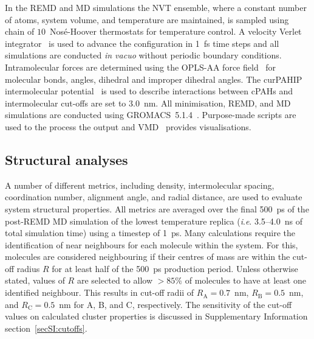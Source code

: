 In the REMD and MD simulations the NVT ensemble, where a constant number of atoms, system volume, and temperature are maintained, is sampled using chain of $10$~Nos\'{e}-Hoover thermostats for temperature control. A velocity Verlet integrator~\cite{Verlet_1967} is used to advance the configuration in 1~fs time steps and all simulations are conducted \textit{in vacuo} without periodic boundary conditions.  Intramolecular forces are determined using the OPLS-AA force field~\cite{Kaminski2001opls} for molecular bonds, angles, dihedral and improper dihedral angles. The curPAHIP intermolecular potential~\cite{bowal2019ion} is used to describe interactions between cPAHs and intermolecular cut-offs are set to $3.0$~nm. All minimisation, REMD, and MD simulations are conducted using GROMACS~5.1.4~\cite{Abraham2015}. Purpose-made scripts are used to the process the output and VMD~\cite{Humphrey1996} provides visualisations.


\subsection{Structural analyses}
A number of different metrics, including density, intermolecular spacing, coordination number, alignment angle, and radial distance, are used to evaluate system structural properties. All metrics are averaged over the final 500~ps of the post-REMD MD simulation of the lowest temperature replica (\textit{i}.\textit{e}. 3.5--4.0~ns of total simulation time) using a timestep of 1~ps. 
Many calculations require the identification of near neighbours for each molecule within the system. For this, molecules are considered neighbouring if their centres of mass are within the cut-off radius $R$ for at least half of the 500~ps production period. Unless otherwise stated, values of $R$ are selected to allow $>85\%$ of molecules to have at least one identified neighbour. This results in cut-off radii of $R_{\text{A}} = 0.7$~nm, $R_{\text{B}} = 0.5$~nm, and $R_{\text{C}} = 0.5$~nm for A, B, and C, respectively.  The sensitivity of the cut-off values on calculated cluster properties is discussed in Supplementary Information section~\ref{secSI:cutoffs}.

